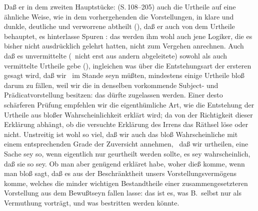 Daß er in dem zweiten Hauptstücke:  (S.\,108--205) auch die Urtheile auf eine ähnliche Weise, wie in dem vorhergehenden die Vorstellungen, in klare und dunkle, deutliche und verworrene abtheilt (), daß er  auch von dem Urtheile behauptet, es hinterlasse Spuren \udgl : das werden ihm  wohl auch jene Logiker, die es bisher nicht ausdrücklich gelehrt hatten, nicht zum Vergehen anrechnen. Auch daß es unvermittelte (\dh\  nicht erst aus andern abgeleitete) sowohl als auch vermittelte Urtheile gebe (), ingleichen was  über die Entstehungsart der ersteren gesagt wird, daß wir \zB\ im Stande seyn müßten, mindestens einige Urtheile bloß darum zu fällen, weil wir die in denselben vorkommende Subject- und Prädicatvorstellung besitzen: das dürfte zugelassen werden. Einer desto schärferen Prüfung empfehlen wir die eigenthümliche Art, wie  die Entstehung der Urtheile aus bloßer Wahrscheinlichkeit erklärt wird; da von der Richtigkeit dieser Erklärung abhängt, ob die  versuchte Erklärung des Irrens das Räthsel löse oder nicht. Unstreitig ist wohl so viel, daß wir auch das bloß Wahrscheinliche mit einem entsprechenden Grade der Zuversicht annehmen, \dh\  daß wir urtheilen, eine Sache sey so, wenn eigentlich nur geurtheilt werden sollte, es sey wahrscheinlich, daß sie so sey. Ob man aber genügend erkläret habe, woher dieß komme, wenn man bloß sagt, daß es aus der Beschränktheit unsers Vorstellungsvermögens komme, welches die minder wichtigen Bestandtheile einer zusammengesetzteren Vorstellung aus dem Bewußtseyn fallen lasse: das ist es, was B.\ selbst nur als Vermuthung vorträgt, und was bestritten werden könnte. \par 
